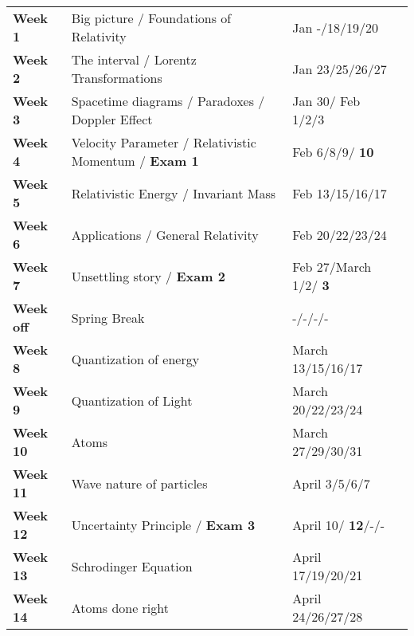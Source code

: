 \documentclass[margin,line]{res}
\newcommand\inRed[1]{{\color{red}  \textbf{#1}}}
\begin{document}
\begin{resume}
\begin{tabular}{llll}
\textbf{Week 1}   & Big picture / Foundations of Relativity        & Jan -/18/19/20 & \\
\textbf{Week 2}   & The interval / Lorentz Transformations         & Jan 23/25/26/27 & \\
\textbf{Week 3}   & Spacetime diagrams / Paradoxes / Doppler Effect        & Jan 30/ Feb 1/2/3 & \\
\textbf{Week 4}   & Velocity Parameter / Relativistic Momentum / \inRed{Exam 1}    & Feb 6/8/9/\inRed{10} & \\
\textbf{Week 5}   & Relativistic Energy / Invariant Mass                  & Feb 13/15/16/17 & \\
\textbf{Week 6}   & Applications / General Relativity                     & Feb 20/22/23/24 & \\
\textbf{Week 7}   &         Unsettling story / \inRed{Exam 2}       & Feb 27/March 1/2/ \inRed{3} & \\
\textbf{Week off} &  Spring Break                              & -/-/-/- & \\
\textbf{Week 8}   &  Quantization of energy & March 13/15/16/17 & \\
\textbf{Week 9}   &  Quantization of Light                     & March 20/22/23/24 & \\
\textbf{Week 10}  &  Atoms                                     & March 27/29/30/31 & \\
\textbf{Week 11}  &  Wave nature of particles                  & April 3/5/6/7 & \\
\textbf{Week 12}  &  Uncertainty Principle /  \inRed{Exam 3}           & April 10/\inRed{12}/-/- & \\
\textbf{Week 13}  &  Schrodinger Equation                      & April 17/19/20/21 & \\
\textbf{Week 14}  &  Atoms done right                          & April 24/26/27/28 & \\
\end{tabular}

\end{resume}
\end{document}
